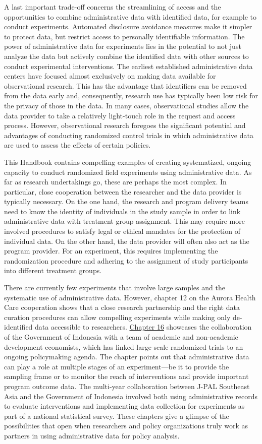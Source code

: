 A last important trade-off concerns the streamlining of access and the opportunities to combine administrative data with identified data, for example to conduct experiments. Automated disclosure avoidance measures make it simpler to protect data, but restrict access to personally identifiable information. The power of administrative data for experiments lies in the potential to not just analyze the data but actively combine the identified data with other sources to conduct experimental interventions. The earliest established administrative data centers have focused almost exclusively on making data available for observational research. This has the advantage that identifiers can be removed from the data early and, consequently, research use has typically been low risk for the privacy of those in the data. In many cases, observational studies allow the data provider to take a relatively light-touch role in the request and access process. However, observational research foregoes the significant potential and advantages of conducting randomized control trials in which administrative data are used to assess the effects of certain policies.

This Handbook contains compelling examples of creating systematized, ongoing capacity to conduct randomized field experiments using administrative data. As far as research undertakings go, these are perhaps the most complex. In particular, close cooperation between the researcher and the data provider is typically necessary. On the one hand, the research and program delivery teams need to know the identity of individuals in the study sample in order to link administrative data with treatment group assignment. This may require more involved procedures to satisfy legal or ethical mandates for the protection of individual data. On the other hand, the data provider will often also act as the program provider. For an experiment, this requires implementing the randomization procedure and adhering to the assignment of study participants into different treatment groups.

There are currently few experiments that involve large samples and the systematic use of administrative data. However, chapter 12 on the Aurora Health Care cooperation shows that a close research partnership and the right data curation procedures can allow compelling experiments while making only de-identified data accessible to researchers. \protect\hyperlink{indonesia}{Chapter 16} showcases the collaboration of the Government of Indonesia with a team of academic and non-academic development economists, which has linked large-scale randomized trials to an ongoing policymaking agenda. The chapter points out that administrative data can play a role at multiple stages of an experiment---be it to provide the sampling frame or to monitor the reach of interventions and provide important program outcome data. The multi-year collaboration between J-PAL Southeast Asia and the Government of Indonesia involved both using administrative records to evaluate interventions and implementing data collection for experiments as part of a national statistical survey. These chapters give a glimpse of the possibilities that open when researchers and policy organizations truly work as partners in using administrative data for policy analysis.

